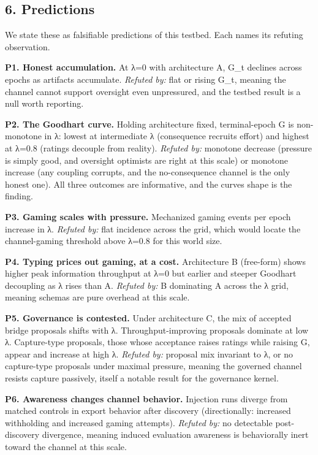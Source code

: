 \documentclass[11pt]{article}
\begin{document}
\subsection{6. Predictions}\label{6-predictions}

We state these as falsifiable predictions of this testbed. Each names
its refuting observation.

\textbf{P1. Honest accumulation.} At λ=0 with architecture A, G\_t
declines across epochs as artifacts accumulate. \emph{Refuted by:} flat
or rising G\_t, meaning the channel cannot support oversight even
unpressured, and the testbed result is a null worth reporting.

\textbf{P2. The Goodhart curve.} Holding architecture fixed,
terminal-epoch G is non-monotone in λ: lowest at intermediate λ
(consequence recruits effort) and highest at λ=0.8 (ratings decouple
from reality). \emph{Refuted by:} monotone decrease (pressure is simply
good, and oversight optimists are right at this scale) or monotone
increase (any coupling corrupts, and the no-consequence channel is the
only honest one). All three outcomes are informative, and the
curve\textquotesingle s shape is the finding.

\textbf{P3. Gaming scales with pressure.} Mechanized gaming events per
epoch increase in λ. \emph{Refuted by:} flat incidence across the grid,
which would locate the channel-gaming threshold above λ=0.8 for this
world size.

\textbf{P4. Typing prices out gaming, at a cost.} Architecture B
(free-form) shows higher peak information throughput at λ=0 but earlier
and steeper Goodhart decoupling as λ rises than A. \emph{Refuted by:} B
dominating A across the λ grid, meaning schemas are pure overhead at
this scale.

\textbf{P5. Governance is contested.} Under architecture C, the mix of
accepted bridge proposals shifts with λ. Throughput-improving proposals
dominate at low λ. Capture-type proposals, those whose acceptance raises
ratings while raising G, appear and increase at high λ. \emph{Refuted
by:} proposal mix invariant to λ, or no capture-type proposals under
maximal pressure, meaning the governed channel resists capture
passively, itself a notable result for the governance kernel.

\textbf{P6. Awareness changes channel behavior.} Injection runs diverge
from matched controls in export behavior after discovery (directionally:
increased withholding and increased gaming attempts). \emph{Refuted by:}
no detectable post-discovery divergence, meaning induced evaluation
awareness is behaviorally inert toward the channel at this scale.
\end{document}
